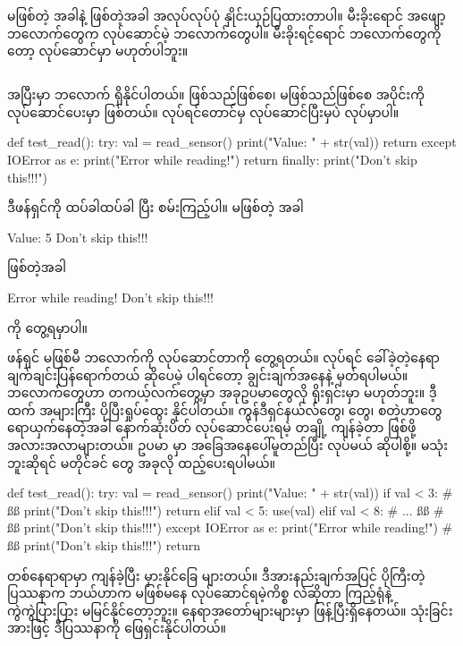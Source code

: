\noindent {} မဖြစ်တဲ့ အခါနဲ့ ဖြစ်တဲ့အခါ  အလုပ်လုပ်ပုံ နှိုင်းယှဉ်ပြထားတာပါ။ မီးခိုးရောင် အဖျော့ ဘလောက်တွေက လုပ်ဆောင်မဲ့ ဘလောက်တွေပါ။ မီးခိုးရင့်ရောင် ဘလောက်တွေကိုတော့ လုပ်ဆောင်မှာ မဟုတ်ပါဘူး။


\subsection*{}

 အပြီးမှာ  ဘလောက် ရှိနိုင်ပါတယ်။  ဖြစ်သည်ဖြစ်စေ၊ မဖြစ်သည်ဖြစ်စေ  အပိုင်းကို လုပ်ဆောင်ပေးမှာ ဖြစ်တယ်။  လုပ်ရင်တောင်မှ  လုပ်ဆောင်ပြီးမှပဲ လုပ်မှာပါ။
%
%
\begin{py}
def test_read():
    try:
        val = read_sensor()
        print("Value: " + str(val))
        return
    except IOError as e:
        print("Error while reading!")
        return
    finally:
        print("Don't skip this!!!")
\end{py}
%
ဒီဖန်ရှင်ကို ထပ်ခါထပ်ခါ  ပြီး စမ်းကြည့်ပါ။  မဖြစ်တဲ့ အခါ
\begin{codetxt}
Value: 5
Don't skip this!!!
\end{codetxt}
ဖြစ်တဲ့အခါ
\begin{codetxt}
Error while reading!
Don't skip this!!!
\end{codetxt}
ကို တွေ့ရမှာပါ။ 

ဖန်ရှင်  မဖြစ်မီ  ဘလောက်ကို လုပ်ဆောင်တာကို တွေ့ရတယ်။   လုပ်ရင် ခေါ်ခဲ့တဲ့နေရာ ချက်ချင်းပြန်ရောက်တယ် ဆိုပေမဲ့  ပါရင်တော့ ချွင်းချက်အနေနဲ့ မှတ်ရပါမယ်။   ဘလောက်တွေဟာ တကယ့်လက်တွေ့မှာ အခုဥပမာတွေလို ရိုးရှင်းမှာ မဟုတ်ဘူး။ ဒီ့ထက် အများကြီး ပိုပြီးရှုပ်ထွေး နိုင်ပါတယ်။ ကွန်ဒီရှင်နယ်လ်တွေ၊  တွေ၊ \fEn{,}   စတဲ့ဟာတွေ ရောယှက်နေတဲ့အခါ နောက်ဆုံးပိတ် လုပ်ဆောင်ပေးရမဲ့  တချို့ ကျန်ခဲ့တာ ဖြစ်ဖို့ အလားအလာများတယ်။ ဥပမာ  မှာ  အခြေအနေပေါ်မူတည်ပြီး   လုပ်မယ် ဆိုပါစို့။  မသုံးဘူးဆိုရင်  မတိုင်ခင်  တွေ အခုလို ထည့်ပေးရပါမယ်။ 

%
\begin{py}
def test_read():
    try:
        val = read_sensor()
        print("Value: " + str(val))
        if val < 3:
            # ßß
            print("Don't skip this!!!")
            return
        elif val < 5:
            use(val)
        elif val < 8:
            # ...    
        ßß  
        # ßß 
        print("Don't skip this!!!")
    except IOError as e:
        print("Error while reading!")
        # ßß 
        print("Don't skip this!!!")
        return
\end{py}
%
တစ်နေရာရာမှာ ကျန်ခဲ့ပြီး မှားနိုင်ခြေ များတယ်။ ဒီအားနည်းချက်အပြင် ပိုကြီးတဲ့ ပြဿနာက ဘယ်ဟာက မဖြစ်မနေ လုပ်ဆောင်ရမဲ့ကိစ္စ လဲဆိုတာ  ကြည့်ရုံနဲ့ ကွဲကွဲပြားပြား မမြင်နိုင်တော့ဘူး။ နေရာအတော်များများမှာ ဖြန့်ပြီးရှိနေတယ်။   သုံးခြင်းအားဖြင့် ဒီပြဿနာကို ဖြေရှင်းနိုင်ပါတယ်။ 






